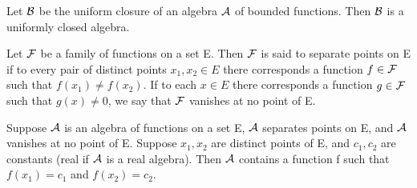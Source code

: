 
\begin{theorem} %
  \label{thm:chap7:closure_of_algebra}
  Let $\mathcal{B}$ be the uniform closure of an algebra
  $\mathcal{A}$ of bounded functions. Then $\mathcal{B}$ is a
  uniformly closed algebra.
\end{theorem}

\begin{definition} %
  \label{def:chap7:separates_points_vanishes_no_point}
  Let $\mathcal{F}$ be a family of functions on a set E. Then
  $\mathcal{F}$ is said to separate points on E if to every pair
  of distinct points $x_1, x_2 \in E$ there corresponds a function $f
  \in \mathcal{F}$ such that $f(x_1) \ne f(x_2)$.
  If to each $x \in E$ there corresponds a function $g \in
  \mathcal{F}$ such that $g(x) \ne 0$, we say that
  $\mathcal{F}$ vanishes at no point of E.
\end{definition}


\begin{theorem} %
  \label{thm:chap7:algebra_prescribed_values}
  Suppose $\mathcal{A}$ is an algebra of functions on a set E,
  $\mathcal{A}$ separates points on E, and $\mathcal{A}$
  vanishes at no point of E. Suppose $x_1, x_2$ are distinct points
  of E, and $c_1, c_2$ are constants (real if $\mathcal{A}$ is a
  real algebra). Then $\mathcal{A}$ contains a function f such
  that $f(x_1) = c_1$ and $f(x_2) = c_2$.
\end{theorem}



